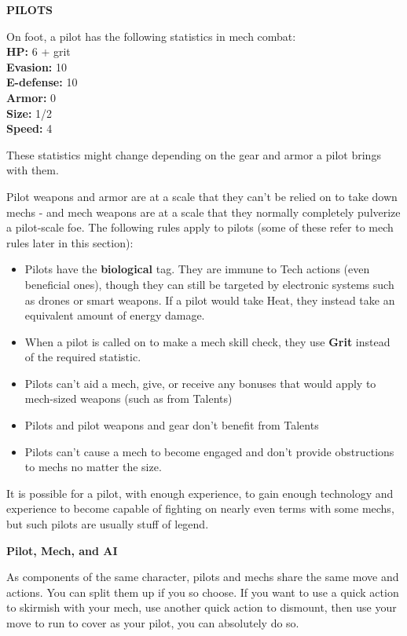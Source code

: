 \begin{center}
    \textbf{PILOTS}    
\end{center}
On foot, a pilot has the following statistics in mech combat:\\
\quad\quad\textbf{HP:} 6 + grit\\
\quad\quad\textbf{Evasion:} 10\\
\quad\quad\textbf{E-defense:} 10\\
\quad\quad\textbf{Armor:} 0\\
\quad\quad\textbf{Size:} 1/2\\
\quad\quad\textbf{Speed:} 4

These statistics might change depending on the gear and armor a pilot brings with them.

Pilot weapons and armor are at a scale that they can’t be relied on to take down mechs - and mech weapons are at a scale that they normally completely pulverize a pilot-scale foe. The following rules apply to pilots (some of these refer to mech rules later in this section):
\begin{itemize}
\item Pilots have the \textbf{biological} tag. They are immune to Tech actions (even beneficial ones), though they can still be targeted by electronic systems such as drones or smart weapons. If a pilot would take Heat, they instead take an equivalent amount of energy damage.
\item When a pilot is called on to make a mech skill check, they use \textbf{Grit} instead of the required statistic.
\item Pilots can’t aid a mech, give, or receive any bonuses that would apply to mech-sized weapons (such as from Talents)
\item Pilots and pilot weapons and gear don’t benefit from Talents
\item Pilots can’t cause a mech to become engaged and don’t provide obstructions to mechs no matter the size.
\end{itemize}

It is possible for a pilot, with enough experience, to gain enough technology and experience to become capable of fighting on nearly even terms with some mechs, but such pilots are usually stuff of legend.

\begin{center}
    \textbf{Pilot, Mech, and AI}    
\end{center}

As components of the same character, pilots and mechs share the same move and actions. You can split them up if you so choose. If you want to use a quick action to skirmish with your mech, use another quick action to dismount, then use your move to run to cover as your pilot, you can absolutely do so.

